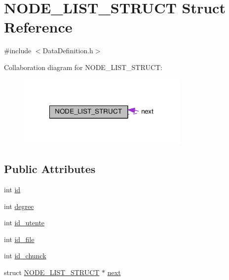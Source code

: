 \hypertarget{structNODE__LIST__STRUCT}{\section{N\-O\-D\-E\-\_\-\-L\-I\-S\-T\-\_\-\-S\-T\-R\-U\-C\-T Struct Reference}
\label{structNODE__LIST__STRUCT}
}


{\ttfamily \#include $<$Data\-Definition.\-h$>$}



Collaboration diagram for N\-O\-D\-E\-\_\-\-L\-I\-S\-T\-\_\-\-S\-T\-R\-U\-C\-T\-:
\nopagebreak
\begin{figure}[H]
\begin{center}
\leavevmode
\includegraphics[width=238pt]{structNODE__LIST__STRUCT__coll__graph}
\end{center}
\end{figure}
\subsection*{Public Attributes}
\begin{DoxyCompactItemize}
\item 
int \hyperlink{structNODE__LIST__STRUCT_a34444a74455d1e7d59e13f1dae754321}{id}
\item 
int \hyperlink{structNODE__LIST__STRUCT_a63170b40e99791988837be24d177f65b}{degree}
\item 
int \hyperlink{structNODE__LIST__STRUCT_a5887adfa6a4a3b94ba786593a12fa7ad}{id\-\_\-utente}
\item 
int \hyperlink{structNODE__LIST__STRUCT_abc43d88cc9b8427972095a4637969389}{id\-\_\-file}
\item 
int \hyperlink{structNODE__LIST__STRUCT_a19a415b69b3c7eb1ddeca6ce76670af9}{id\-\_\-chunck}
\item 
struct \hyperlink{structNODE__LIST__STRUCT}{N\-O\-D\-E\-\_\-\-L\-I\-S\-T\-\_\-\-S\-T\-R\-U\-C\-T} $\ast$ \hyperlink{structNODE__LIST__STRUCT_a16cafa75205cd9acf5039b4502613f1a}{next}
\end{DoxyCompactItemize}


